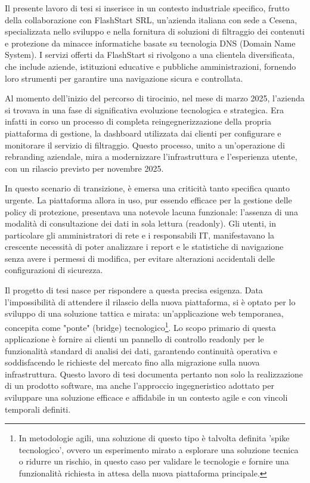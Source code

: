 \documentclass[12pt,a4paper,openright,twoside]{book}
\begin{document}
Il presente lavoro di tesi si inserisce in un contesto industriale specifico, frutto della collaborazione con FlashStart SRL, un'azienda italiana con sede a Cesena, specializzata nello sviluppo e nella fornitura di soluzioni di filtraggio dei contenuti e protezione da minacce informatiche basate su tecnologia DNS (Domain Name System). I servizi offerti da FlashStart si rivolgono a una clientela diversificata, che include aziende, istituzioni educative e pubbliche amministrazioni, fornendo loro strumenti per garantire una navigazione sicura e controllata.

Al momento dell'inizio del percorso di tirocinio, nel mese di marzo 2025, l'azienda si trovava in una fase di significativa evoluzione tecnologica e strategica. Era infatti in corso un processo di completa reingegnerizzazione della propria piattaforma di gestione, la dashboard utilizzata dai clienti per configurare e monitorare il servizio di filtraggio. Questo processo, unito a un'operazione di rebranding aziendale, mira a modernizzare l'infrastruttura e l'esperienza utente, con un rilascio previsto per novembre 2025.

In questo scenario di transizione, è emersa una criticità tanto specifica quanto urgente. La piattaforma allora in uso, pur essendo efficace per la gestione delle policy di protezione, presentava una notevole lacuna funzionale: l'assenza di una modalità di consultazione dei dati in sola lettura (readonly). Gli utenti, in particolare gli amministratori di rete e i responsabili IT, manifestavano la crescente necessità di poter analizzare i report e le statistiche di navigazione senza avere i permessi di modifica, per evitare alterazioni accidentali delle configurazioni di sicurezza.

Il progetto di tesi nasce per rispondere a questa precisa esigenza. Data l'impossibilità di attendere il rilascio della nuova piattaforma, si è optato per lo sviluppo di una soluzione tattica e mirata: un'applicazione web temporanea, concepita come "ponte" (bridge) tecnologico\footnote{In metodologie agili, una soluzione di questo tipo è talvolta definita 'spike tecnologico', ovvero un esperimento mirato a esplorare una soluzione tecnica o ridurre un rischio, in questo caso per validare le tecnologie e fornire una funzionalità richiesta in attesa della nuova piattaforma principale.}. Lo scopo primario di questa applicazione è fornire ai clienti un pannello di controllo readonly per le funzionalità standard di analisi dei dati, garantendo continuità operativa e soddisfacendo le richieste del mercato fino alla migrazione sulla nuova infrastruttura. Questo lavoro di tesi documenta pertanto non solo la realizzazione di un prodotto software, ma anche l'approccio ingegneristico adottato per sviluppare una soluzione efficace e affidabile in un contesto agile e con vincoli temporali definiti.
\end{document}
